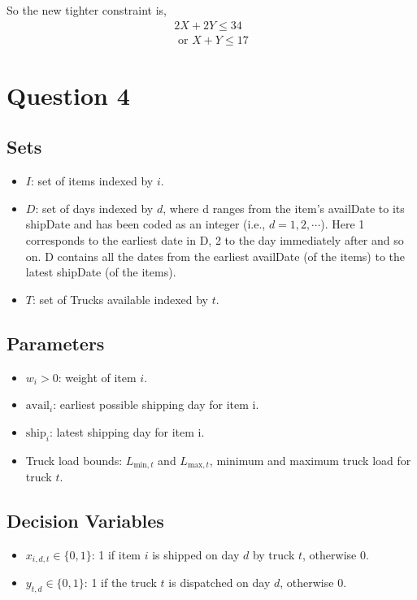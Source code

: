 \documentclass[11pt]{article}
\begin{document}
So the new tighter constraint is,
\begin{align*}
    2X + 2Y \leq 34\\
    \text{ or } X + Y \leq 17
\end{align*}

\section*{Question 4}
\subsection*{Sets}
\begin{itemize}
    \item $I$: set of items indexed by \(i\).
    \item $D$: set of days indexed by $d$, where d ranges from the item's availDate to its shipDate and has been coded as an integer (i.e., $d = 1,2,\cdots$). Here 1 corresponds to the earliest date in D, 2 to the day immediately after and so on. D contains all the dates from the earliest availDate (of the items) to the latest shipDate (of the items).
    \item $T$: set of Trucks available indexed by \(t\).
\end{itemize}

\subsection*{Parameters}
\begin{itemize}
    \item \(w_i > 0\): weight of item \(i\).
    \item \(\text{avail}_i\): earliest possible shipping day for item i.
    \item \(\text{ship}_i\): latest shipping day for item i.
    \item Truck load bounds: \(L_{\text{min},t}\) and \(L_{\text{max},t}\), minimum and maximum truck load for truck \(t\).
\end{itemize}

\subsection*{Decision Variables}
\begin{itemize}
    \item \(x_{i,d,t} \in \{0,1\}\): 1 if item \(i\) is shipped on day \(d\) by truck \(t\), otherwise 0.
    \item \(y_{t,d} \in \{0,1\}\): 1 if the truck \(t\) is dispatched on day \(d\), otherwise 0.
\end{itemize}
\end{document}

